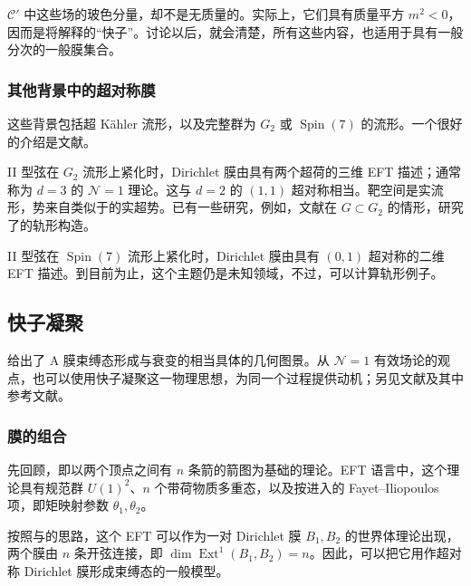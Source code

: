 $\mathcal{C}'$ 中这些场的玻色分量，却不是无质量的。实际上，它们具有质量平方 $m^2<0$，因而是将解释的“快子”。讨论以后，就会清楚，所有这些内容，也适用于具有一般分次的一般膜集合。

\subsubsection{其他背景中的超对称膜}\label{sec:5.4.3.7}

这些背景包括超 K\"ahler 流形，以及完整群为 $G_2$ 或 $\operatorname{Spin}(7)$ 的流形。一个很好的介绍是文献。

II 型弦在 $G_2$ 流形上紧化时，Dirichlet 膜由具有两个超荷的三维 EFT 描述；通常称为 $d=3$ 的 $\mathcal{N}=1$ 理论。这与 $d=2$ 的 $(1,1)$ 超对称相当。靶空间是实流形，势来自类似于的实超势。已有一些研究，例如，文献在 $G\subset G_2$ 的情形，研究了的轨形构造。

II 型弦在 $\operatorname{Spin}(7)$ 流形上紧化时，Dirichlet 膜由具有 $(0,1)$ 超对称的二维 EFT 描述。到目前为止，这个主题仍是未知领域，不过，可以计算轨形例子。

\subsection{快子凝聚}\label{sec:5.4.4}

给出了 A 膜束缚态形成与衰变的相当具体的几何图景。从 $\mathcal{N}=1$ 有效场论的观点，也可以使用快子凝聚这一物理思想，为同一个过程提供动机；另见文献及其中参考文献。

\subsubsection{膜的组合}\label{sec:5.4.4.1}

先回顾，即以两个顶点之间有 $n$ 条箭的箭图为基础的理论。EFT 语言中，这个理论具有规范群 $U(1)^2$、$n$ 个带荷物质多重态，以及按进入的 Fayet--Iliopoulos 项，即矩映射参数 $\theta_1,\theta_2$。

按照与的思路，这个 EFT 可以作为一对 Dirichlet 膜 $B_1,B_2$ 的世界体理论出现，两个膜由 $n$ 条开弦连接，即 $\dim\operatorname{Ext}^1(B_1,B_2)=n$。因此，可以把它用作超对称 Dirichlet 膜形成束缚态的一般模型。

